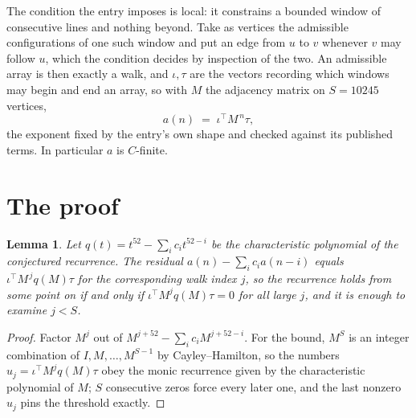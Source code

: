 \documentclass[11pt,a4paper]{article}
\theoremstyle{plain}
\newtheorem{lemma}[theorem]{Lemma}
\theoremstyle{definition}
\begin{document}
The condition the entry imposes is local: it constrains a bounded window of consecutive lines and nothing beyond. Take as vertices the admissible configurations of one such window and put an edge from $u$ to $v$ whenever $v$ may follow $u$, which the condition decides by inspection of the two.
An admissible array is then exactly a walk, and $\iota,\tau$ are the vectors recording which windows may begin and end an array, so with $M$ the adjacency matrix on $S=10245$ vertices,
\[
a(n)\;=\;\iota^{\!\top}M^{\,n}\tau ,
\]
the exponent fixed by the entry's own shape and checked against its published terms. In
particular $a$ is $C$-finite.

\section{The proof}

\begin{lemma}\label{lem:crit}
Let $q(t)=t^{52}-\sum_i c_it^{52-i}$ be the characteristic polynomial of the
conjectured recurrence. The residual $a(n)-\sum_ic_ia(n-i)$ equals
$\iota^{\!\top}M^{\,j}q(M)\tau$ for the corresponding walk index $j$, so the recurrence
holds from some point on if and only if $\iota^{\!\top}M^{j}q(M)\tau=0$ for all large $j$,
and it is enough to examine $j<S$.
\end{lemma}

\begin{proof}
Factor $M^{j}$ out of $M^{j+52}-\sum_ic_iM^{j+52-i}$. For the bound, $M^{S}$
is an integer combination of $I,M,\dots,M^{S-1}$ by Cayley--Hamilton, so the numbers
$u_j=\iota^{\!\top}M^{j}q(M)\tau$ obey the monic recurrence given by the characteristic
polynomial of $M$; $S$ consecutive zeros force every later one, and the last nonzero $u_j$
pins the threshold exactly.
\end{proof}
\end{document}
